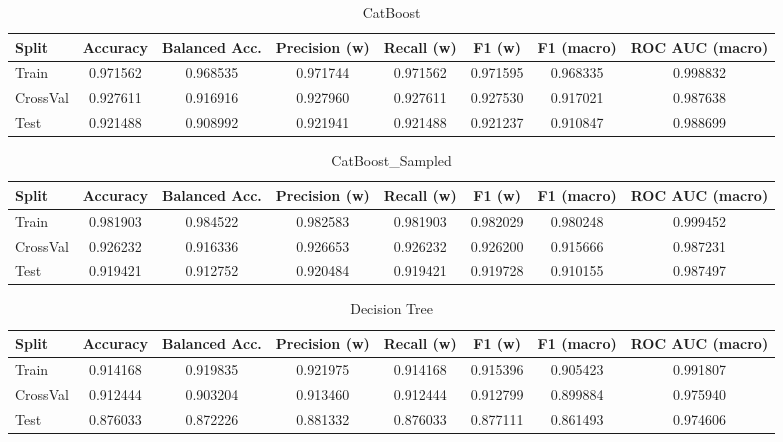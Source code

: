 \begin{table}[H]
	\centering
	\caption{CatBoost}
	\begin{adjustbox}{max width=\textwidth}
		\begin{tabular}{lccccccc}
			\toprule
			Split & Accuracy & Balanced Acc. & Precision (w) & Recall (w) & F1 (w) & F1 (macro) & ROC AUC (macro) \\
			\midrule
			Train & 0.971562 & 0.968535 & 0.971744 & 0.971562 & 0.971595 & 0.968335 & 0.998832 \\
			CrossVal & 0.927611 & 0.916916 & 0.927960 & 0.927611 & 0.927530 & 0.917021 & 0.987638 \\
			Test & 0.921488 & 0.908992 & 0.921941 & 0.921488 & 0.921237 & 0.910847 & 0.988699 \\
			\bottomrule
		\end{tabular}
	\end{adjustbox}
\end{table}

\begin{table}[H]
	\centering
	\caption{CatBoost\_Sampled}
	\begin{adjustbox}{max width=\textwidth}
		\begin{tabular}{lccccccc}
			\toprule
			Split & Accuracy & Balanced Acc. & Precision (w) & Recall (w) & F1 (w) & F1 (macro) & ROC AUC (macro) \\
			\midrule
			Train & 0.981903 & 0.984522 & 0.982583 & 0.981903 & 0.982029 & 0.980248 & 0.999452 \\
			CrossVal & 0.926232 & 0.916336 & 0.926653 & 0.926232 & 0.926200 & 0.915666 & 0.987231 \\
			Test & 0.919421 & 0.912752 & 0.920484 & 0.919421 & 0.919728 & 0.910155 & 0.987497 \\
			\bottomrule
		\end{tabular}
	\end{adjustbox}
\end{table}

\begin{table}[H]
	\centering
	\caption{Decision Tree}
	\begin{adjustbox}{max width=\textwidth}
		\begin{tabular}{lccccccc}
			\toprule
			Split & Accuracy & Balanced Acc. & Precision (w) & Recall (w) & F1 (w) & F1 (macro) & ROC AUC (macro) \\
			\midrule
			Train & 0.914168 & 0.919835 & 0.921975 & 0.914168 & 0.915396 & 0.905423 & 0.991807 \\
			CrossVal & 0.912444 & 0.903204 & 0.913460 & 0.912444 & 0.912799 & 0.899884 & 0.975940 \\
			Test & 0.876033 & 0.872226 & 0.881332 & 0.876033 & 0.877111 & 0.861493 & 0.974606 \\
			\bottomrule
		\end{tabular}
	\end{adjustbox}
\end{table}

